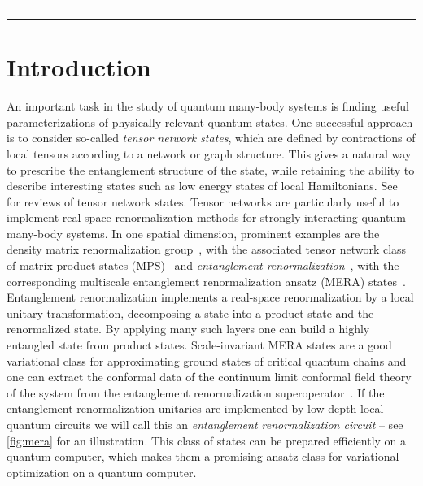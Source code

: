 \documentclass[submission, Phys]{SciPost}
\theoremstyle{definition}
\theoremstyle{remark}
\newcommand{\change}[1]{#1}
\begin{document}
\vspace{10pt}
\noindent\rule{\textwidth}{1pt}
\tableofcontents\thispagestyle{fancy}
\noindent\rule{\textwidth}{1pt}
\vspace{10pt}

\section{Introduction}
\change{An important task in the study of quantum many-body systems is finding useful parameterizations of physically relevant quantum states.
One successful approach is to consider so-called \emph{tensor network states}, which are defined by contractions of local tensors according to a network or graph structure.
This gives a natural way to prescribe the entanglement structure of the state, while retaining the ability to describe interesting states such as low energy states of local Hamiltonians.
See~\cite{orus2019tensor,orus2014practical,montangero2018introduction,eisert2010colloquium} for reviews of tensor network states.
Tensor networks are particularly useful to implement real-space renormalization methods for strongly interacting quantum many-body systems.}
In one spatial dimension, prominent examples are the density matrix renormalization group~\cite{white1992density}, with the associated tensor network class of matrix product states (MPS)~\cite{schollwock2011density} and \emph{entanglement renormalization}~\cite{vidal2007entanglement}, with the corresponding multiscale entanglement renormalization ansatz (MERA) states~\cite{vidal2007entanglement, vidal2008class}.
Entanglement renormalization implements a real-space renormalization by a local unitary transformation, decomposing a state into a product state and the renormalized state.
By applying many such layers one can build a highly entangled state from product states.
Scale-invariant MERA states are a good variational class for approximating ground states of critical quantum chains and one can extract the conformal data of the continuum limit conformal field theory of the system from the entanglement renormalization superoperator~\cite{evenbly2013quantum}.
If the entanglement renormalization unitaries are implemented by low-depth local quantum circuits we will call this an \emph{entanglement renormalization circuit} -- see \cref{fig:mera} for an illustration.
This class of states can be prepared efficiently on a quantum computer, which makes them a promising ansatz class for variational optimization on a quantum computer.
\end{document}
